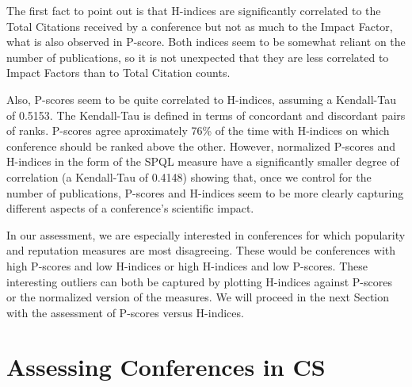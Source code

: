 \documentclass[notitlepage]{svjour3}
\begin{document}
The first fact to point out is that H-indices are significantly correlated to the Total Citations
received by a conference but not as much to the Impact Factor,
what is also observed in P-score. Both indices seem to be somewhat reliant on the number of 
publications, so it is not unexpected that they are less correlated to Impact Factors
than to Total Citation counts. 

Also, P-scores seem to be quite correlated to H-indices, assuming a Kendall-Tau of 0.5153.
The Kendall-Tau is defined in terms of concordant and discordant pairs of ranks.
P-scores agree aproximately 76\% of the time with H-indices on which conference should be
ranked above the other. However, normalized P-scores and H-indices in the form of the SPQL
measure have a significantly smaller degree of correlation (a Kendall-Tau of 0.4148) 
showing that, once we control for the number of publications, P-scores and H-indices seem
to be more clearly capturing different aspects of a conference's scientific impact. 

In our assessment, we are especially interested in conferences for which popularity 
and reputation measures are most disagreeing. These would be conferences with high P-scores 
and low H-indices or high H-indices and low P-scores. These interesting outliers can both
be captured by plotting H-indices against P-scores or the normalized version of the measures.
We will proceed in the next Section with the assessment of P-scores versus H-indices.


\section{Assessing Conferences in CS}
\label{sec:notifications}
\end{document}
